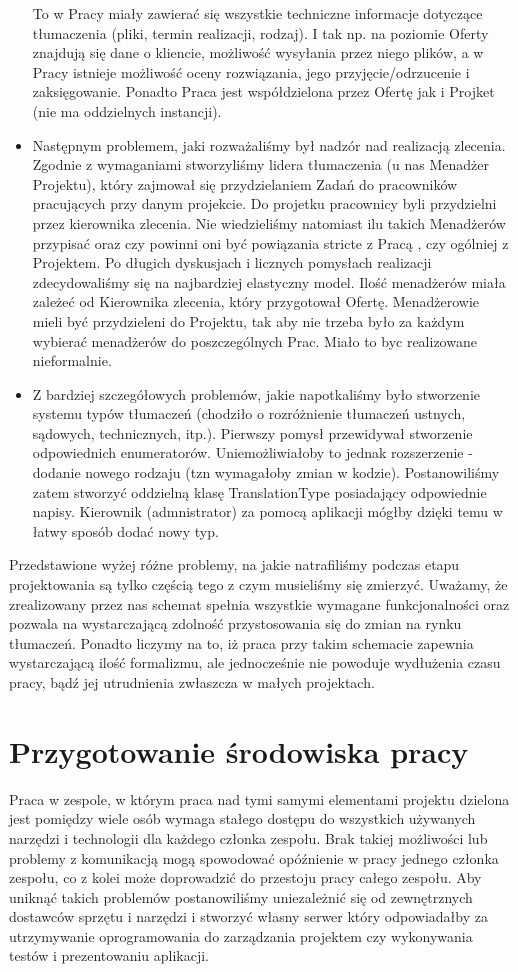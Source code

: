 \documentclass[licencjacka]{pracamgr}
\begin{document}
\begin{itemize}
To w Pracy miały zawierać się wszystkie techniczne informacje dotyczące tłumaczenia (pliki, termin realizacji, rodzaj). I tak np. na poziomie Oferty  znajdują się dane o kliencie,
możliwość wysyłania przez niego plików, a w Pracy istnieje możliwość oceny rozwiązania, jego przyjęcie/odrzucenie i zaksięgowanie.
Ponadto Praca jest współdzielona przez Ofertę jak i Projket (nie ma oddzielnych instancji).
\item Następnym problemem, jaki rozważaliśmy był nadzór nad realizacją zlecenia. Zgodnie z wymaganiami stworzyliśmy lidera tłumaczenia (u nas Menadżer Projektu), 
który zajmował się przydzielaniem Zadań do pracowników pracujących przy danym projekcie. Do projetku pracownicy byli przydzielni przez kierownika zlecenia.
Nie wiedzieliśmy natomiast ilu takich Menadżerów przypisać oraz czy powinni oni być powiązania stricte z Pracą , czy ogólniej z Projektem. 
Po długich dyskusjach i licznych pomysłach realizacji zdecydowaliśmy się na najbardziej elastyczny model. Ilość menadżerów miała zależeć od Kierownika zlecenia, który przygotował Ofertę. 
Menadżerowie mieli być przydzieleni do Projektu, tak aby nie trzeba było za każdym wybierać menadżerów do poszczególnych Prac.
Miało to byc realizowane nieformalnie.
\item Z bardziej szczegółowych problemów, jakie napotkaliśmy było stworzenie systemu typów tłumaczeń (chodziło o rozróżnienie tłumaczeń ustnych, sądowych, technicznych, itp.).
Pierwszy pomysł przewidywał stworzenie odpowiednich enumeratorów. Uniemożliwiałoby to jednak rozszerzenie - dodanie nowego rodzaju (tzn wymagałoby zmian w kodzie). 
Postanowiliśmy zatem stworzyć oddzielną klasę TranslationType posiadający odpowiednie napisy. Kierownik (admnistrator) za pomocą aplikacji mógłby dzięki temu w łatwy sposób dodać nowy typ.
\end{itemize}
Przedstawione wyżej różne problemy, na jakie natrafiliśmy podczas etapu projektowania są tylko częścią tego z czym musieliśmy się zmierzyć. 
Uważamy, że zrealizowany przez nas schemat spełnia wszystkie wymagane funkcjonalności oraz pozwala na wystarczającą zdolność przystosowania się do zmian na rynku tłumaczeń.
Ponadto liczymy na to, iż praca przy takim schemacie zapewnia wystarczającą ilość formalizmu, ale jednocześnie nie powoduje wydłużenia czasu pracy, bądź jej utrudnienia zwłaszcza w małych projektach. 

\section{Przygotowanie środowiska pracy}
Praca w zespole, w którym praca nad tymi samymi elementami projektu dzielona jest pomiędzy wiele osób wymaga stałego dostępu do wszystkich używanych narzędzi i technologii dla każdego członka zespołu. Brak takiej możliwości lub problemy z komunikacją mogą spowodować opóźnienie w pracy jednego członka zespołu, co z kolei może doprowadzić do przestoju pracy całego zespołu. Aby uniknąć takich problemów postanowiliśmy uniezależnić się od zewnętrznych dostawców sprzętu i narzędzi i stworzyć własny serwer który odpowiadałby za utrzymywanie oprogramowania do zarządzania projektem czy wykonywania testów i prezentowaniu aplikacji. \\
\end{document}
